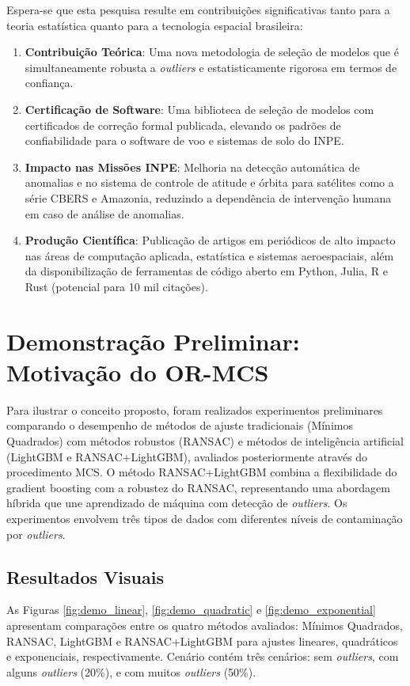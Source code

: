 \documentclass[12pt,a4paper]{article}
\newcommand{\outliers}{\textit{outliers}}
\begin{document}
Espera-se que esta pesquisa resulte em contribuições significativas tanto para a teoria estatística quanto para a tecnologia espacial brasileira:
\begin{enumerate}
  \item \textbf{Contribuição Teórica}: Uma nova metodologia de seleção de modelos que é simultaneamente robusta a \outliers{} e estatisticamente rigorosa em termos de confiança.
  \item \textbf{Certificação de Software}: Uma biblioteca de seleção de modelos com certificados de correção formal publicada, elevando os padrões de confiabilidade para o software de voo e sistemas de solo do INPE.
  \item \textbf{Impacto nas Missões INPE}: Melhoria na detecção automática de anomalias e no sistema de controle de atitude e órbita para satélites como a série CBERS e Amazonia, reduzindo a dependência de intervenção humana em caso de análise de anomalias.
  \item \textbf{Produção Científica}: Publicação de artigos em periódicos de alto impacto nas áreas de computação aplicada, estatística e sistemas aeroespaciais, além da disponibilização de ferramentas de código aberto em Python, Julia, R e Rust (potencial para 10 mil citações).
\end{enumerate}

\section{Demonstração Preliminar: Motivação do OR-MCS}

Para ilustrar o conceito proposto, foram realizados experimentos preliminares comparando o desempenho de métodos de ajuste tradicionais (Mínimos Quadrados) com métodos robustos (RANSAC) e métodos de inteligência artificial (LightGBM e RANSAC+LightGBM), avaliados posteriormente através do procedimento MCS. O método RANSAC+LightGBM combina a flexibilidade do gradient boosting com a robustez do RANSAC, representando uma abordagem híbrida que une aprendizado de máquina com detecção de \outliers{}. Os experimentos envolvem três tipos de dados com diferentes níveis de contaminação por \outliers{}.

\subsection{Resultados Visuais}

As Figuras \ref{fig:demo_linear}, \ref{fig:demo_quadratic} e \ref{fig:demo_exponential} apresentam comparações entre os quatro métodos avaliados: Mínimos Quadrados, RANSAC, LightGBM e RANSAC+LightGBM para ajustes lineares, quadráticos e exponenciais, respectivamente. Cenário contém três cenários: sem \outliers{}, com alguns \outliers{} (20\%), e com muitos \outliers{} (50\%).
\end{document}

